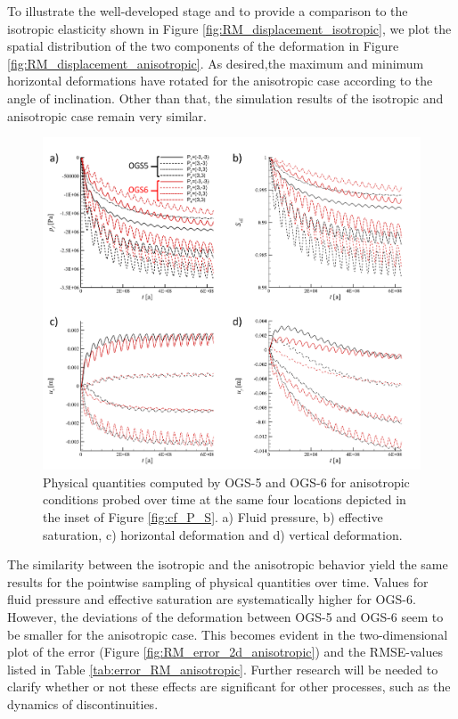 To illustrate the well-developed stage and to provide a comparison to the isotropic elasticity shown in Figure \ref{fig:RM_displacement_isotropic}, we plot the spatial distribution of the two components of the deformation in Figure \ref{fig:RM_displacement_anisotropic}. As desired,the maximum and minimum horizontal deformations have rotated for the anisotropic case according to the angle of inclination. Other than that, the simulation results of the isotropic and anisotropic case  remain very similar.

\begin{figure}[t]
\includegraphics[width=\textwidth, trim=0.5cm  0.0cm 0 0.0cm, clip]{./figures/MEX10_probe_over_time_anisotropic.png}
\caption{Physical quantities computed by OGS-5 and OGS-6 for anisotropic conditions probed over time at the same four locations depicted in the inset of Figure \ref{fig:cf_P_S}. a) Fluid pressure, b) effective saturation, c) horizontal deformation and d) vertical deformation.}
\label{fig:RM_probe_over_time_anisotropic}
\end{figure}

The similarity between the isotropic and the anisotropic behavior yield the same results for the pointwise sampling of physical quantities over time. Values for fluid pressure and effective saturation are systematically higher for OGS-6. However, the deviations of the deformation  between OGS-5 and OGS-6 seem to be smaller for the anisotropic case. This becomes evident in the two-dimensional plot of the error (Figure \ref{fig:RM_error_2d_anisotropic}) and the RMSE-values listed in Table \ref{tab:error_RM_anisotropic}. Further research will be needed to clarify whether or not these effects are significant for other processes, such as the dynamics of discontinuities.

